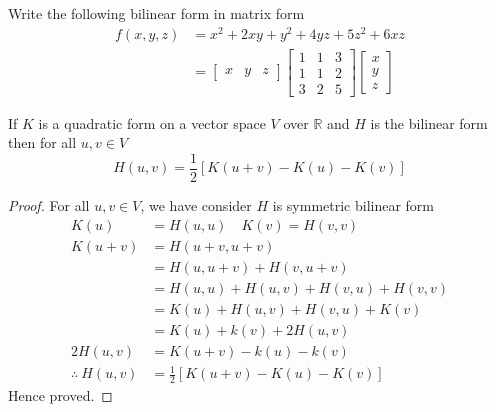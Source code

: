 \begin{example}
Write the following bilinear form in matrix form
\begin{align*}
    f(x,y,z)&=x^{2}+2xy+y^{2}+4yz+5z^{2}+6xz\\
&=\left[\begin{array}{ccc}x&y&z\end{array}\right] 
\left[\begin{array}{ccc}
     1&1&3\\1&1&2\\3&2&5
\end{array}\right] \left[\begin{array}{c}
     x\\y\\z
\end{array}\right] 
\end{align*}
\end{example}
\begin{theorem}
If $K$ is a quadratic form on a vector space $V$ over $\mathbb{R}$ and $H$ is the bilinear form then for all $u,v \in V$ 
$$H(u,v)=\frac{1}{2}\left[K(u+v)-K(u)-K(v)\right]$$ 
\end{theorem}
\begin{proof}
For all $u,v\in V$, we have
consider $H$ is symmetric bilinear form
\begin{align*}
    K(u)&=H(u,u)\quad K(v)=H(v,v)\\
    K(u+v)&=H(u+v,u+v)\\
    &=H(u,u+v)+H(v,u+v)\\
    &=H(u,u)+H(u,v)+H(v,u)+H(v,v)\\
    &=K(u)+H(u,v)+H(v,u)+K(v)\\
    &=K(u)+k(v)+2H(u,v)\\
    2H(u,v)&=K(u+v)-k(u)-k(v)\\
    \therefore~ H(u,v)&=\frac{1}{2}\left[K(u+v)-K(u)-K(v)\right] 
\end{align*}
Hence proved.
\end{proof}

